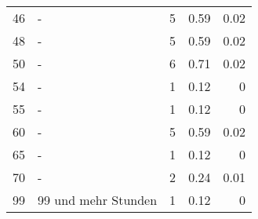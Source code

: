 \begin{longtable}{lXrrr}
        46 & \multicolumn{1}{X}{-} & %
          \num{5} &
          \num[round-mode=places,round-precision=2]{0,59} &
          \num[round-mode=places,round-precision=2]{0,02} \\

        48 & \multicolumn{1}{X}{-} & %
          \num{5} &
          \num[round-mode=places,round-precision=2]{0,59} &
          \num[round-mode=places,round-precision=2]{0,02} \\

        50 & \multicolumn{1}{X}{-} & %
          \num{6} &
          \num[round-mode=places,round-precision=2]{0,71} &
          \num[round-mode=places,round-precision=2]{0,02} \\

        54 & \multicolumn{1}{X}{-} & %
          \num{1} &
          \num[round-mode=places,round-precision=2]{0,12} &
          \num[round-mode=places,round-precision=2]{0} \\

        55 & \multicolumn{1}{X}{-} & %
          \num{1} &
          \num[round-mode=places,round-precision=2]{0,12} &
          \num[round-mode=places,round-precision=2]{0} \\

        60 & \multicolumn{1}{X}{-} & %
          \num{5} &
          \num[round-mode=places,round-precision=2]{0,59} &
          \num[round-mode=places,round-precision=2]{0,02} \\

        65 & \multicolumn{1}{X}{-} & %
          \num{1} &
          \num[round-mode=places,round-precision=2]{0,12} &
          \num[round-mode=places,round-precision=2]{0} \\

        70 & \multicolumn{1}{X}{-} & %
          \num{2} &
          \num[round-mode=places,round-precision=2]{0,24} &
          \num[round-mode=places,round-precision=2]{0,01} \\

        99 & \multicolumn{1}{X}{99 und mehr Stunden} & %
          \num{1} &
          \num[round-mode=places,round-precision=2]{0,12} &
          \num[round-mode=places,round-precision=2]{0} \\


\end{longtable}
